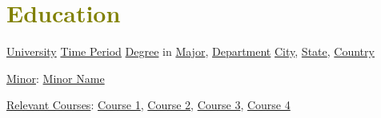 

\section{\textcolor{olive}{\textbf{Education}}}
	\resumeSubHeadingListStart
		
    \resumeSubheading
        {\underline{University}}
        {\underline{Time Period}}
        {\underline{Degree} in \underline{Major}, \underline{Department}}
        {\textcolor{gray}{\footnotesize{\faMapMarker}} \underline{City}, \underline{State}, \underline{Country}}

    \resumeItemListStart
        \item {
            \underline{Minor}: \underline{Minor Name}
        }
        \item {
            \underline{Relevant Courses}: \underline{Course 1}, \underline{Course 2}, \underline{Course 3}, \underline{Course 4}
        }
    \resumeItemListEnd
		  
	\resumeSubHeadingListEnd
